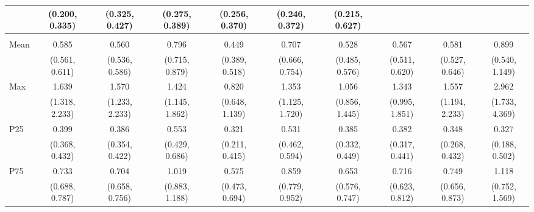 {\begin{tabular}{l|c|c|c|c|c|c|c|c|c}
& {\scriptsize (0.200, 0.335)}
& {\scriptsize (0.325, 0.427)}
& {\scriptsize (0.275, 0.389)}
& {\scriptsize (0.256, 0.370)}
& {\scriptsize (0.246, 0.372)}
& {\scriptsize (0.215, 0.627)}
\\ [0.1cm]
\hline
\noalign{\smallskip}
\multicolumn{10}{l}{\textbf{Effect with Leads and Lags}} \\
\noalign{\smallskip}
\hline
Mean
& 0.585 & 0.560 & 0.796 & 0.449 & 0.707 & 0.528 & 0.567 & 0.581 & 0.899 \\
& {\scriptsize (0.561, 0.611)}
& {\scriptsize (0.536, 0.586)}
& {\scriptsize (0.715, 0.879)}
& {\scriptsize (0.389, 0.518)}
& {\scriptsize (0.666, 0.754)}
& {\scriptsize (0.485, 0.576)}
& {\scriptsize (0.511, 0.620)}
& {\scriptsize (0.527, 0.646)}
& {\scriptsize (0.540, 1.149)}
\\ [0.1cm]
\hline
Max
& 1.639 & 1.570 & 1.424 & 0.820 & 1.353 & 1.056 & 1.343 & 1.557 & 2.962 \\
& {\scriptsize (1.318, 2.233)}
& {\scriptsize (1.233, 2.233)}
& {\scriptsize (1.145, 1.862)}
& {\scriptsize (0.648, 1.139)}
& {\scriptsize (1.125, 1.720)}
& {\scriptsize (0.856, 1.445)}
& {\scriptsize (0.995, 1.851)}
& {\scriptsize (1.194, 2.233)}
& {\scriptsize (1.733, 4.369)}
\\ [0.1cm]
\hline
P25
& 0.399 & 0.386 & 0.553 & 0.321 & 0.531 & 0.385 & 0.382 & 0.348 & 0.327 \\
& {\scriptsize (0.368, 0.432)}
& {\scriptsize (0.354, 0.422)}
& {\scriptsize (0.429, 0.686)}
& {\scriptsize (0.211, 0.415)}
& {\scriptsize (0.462, 0.594)}
& {\scriptsize (0.332, 0.449)}
& {\scriptsize (0.317, 0.441)}
& {\scriptsize (0.268, 0.432)}
& {\scriptsize (0.188, 0.502)}
\\ [0.1cm]
\hline
P75
& 0.733 & 0.704 & 1.019 & 0.575 & 0.859 & 0.653 & 0.716 & 0.749 & 1.118 \\
& {\scriptsize (0.688, 0.787)}
& {\scriptsize (0.658, 0.756)}
& {\scriptsize (0.883, 1.188)}
& {\scriptsize (0.473, 0.694)}
& {\scriptsize (0.779, 0.952)}
& {\scriptsize (0.576, 0.747)}
& {\scriptsize (0.623, 0.812)}
& {\scriptsize (0.656, 0.873)}
& {\scriptsize (0.752, 1.569)}
\\ [0.1cm]
\hline
\hline
\end{tabular}
}

